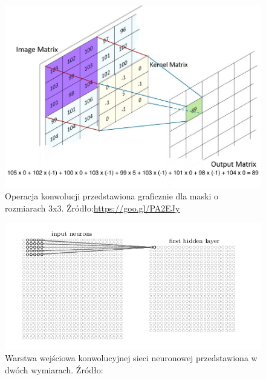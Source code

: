 \begin{figure}[ht!]
\centering
\includegraphics[scale=0.5]{res/exConvolution2.jpg}
\caption[Caption for LOF]{Operacja konwolucji przedstawiona graficznie dla maski o rozmiarach 3x3. Źródło:\url{https://goo.gl/PA2EJy}\label{exConvolution}} 
\end{figure}

\begin{figure}[ht!]
\centering
\includegraphics[scale=0.6]{res/cnn1.png}
\caption[Caption for LOF]{Warstwa wejściowa konwolucyjnej sieci neuronowej przedstawiona w dwóch wymiarach. Źródło:\cite{nielsen}\label{cnn1}} 
\end{figure}


